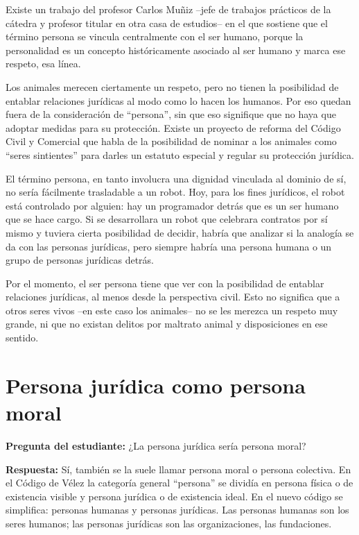 \documentclass[12pt,oneside]{book}
\begin{document}
Existe un trabajo del profesor Carlos Muñiz --jefe de trabajos prácticos de la cátedra y profesor titular en otra casa de estudios-- en el que sostiene que el término persona se vincula centralmente con el ser humano, porque la personalidad es un concepto históricamente asociado al ser humano y marca ese respeto, esa línea.

Los animales merecen ciertamente un respeto, pero no tienen la posibilidad de entablar relaciones jurídicas al modo como lo hacen los humanos. Por eso quedan fuera de la consideración de ``persona'', sin que eso signifique que no haya que adoptar medidas para su protección. Existe un proyecto de reforma del Código Civil y Comercial que habla de la posibilidad de nominar a los animales como ``seres sintientes'' para darles un estatuto especial y regular su protección jurídica.

El término persona, en tanto involucra una dignidad vinculada al dominio de sí, no sería fácilmente trasladable a un robot. Hoy, para los fines jurídicos, el robot está controlado por alguien: hay un programador detrás que es un ser humano que se hace cargo. Si se desarrollara un robot que celebrara contratos por sí mismo y tuviera cierta posibilidad de decidir, habría que analizar si la analogía se da con las personas jurídicas, pero siempre habría una persona humana o un grupo de personas jurídicas detrás.

\begin{note}
Por el momento, el ser persona tiene que ver con la posibilidad de entablar relaciones jurídicas, al menos desde la perspectiva civil. Esto no significa que a otros seres vivos --en este caso los animales-- no se les merezca un respeto muy grande, ni que no existan delitos por maltrato animal y disposiciones en ese sentido.
\end{note}

\section{Persona jurídica como persona moral}

\textbf{Pregunta del estudiante:} ¿La persona jurídica sería persona moral?

\textbf{Respuesta:} Sí, también se la suele llamar persona moral o persona colectiva. En el Código de Vélez la categoría general ``persona'' se dividía en persona física o de existencia visible y persona jurídica o de existencia ideal. En el nuevo código se simplifica: personas humanas y personas jurídicas. Las personas humanas son los seres humanos; las personas jurídicas son las organizaciones, las fundaciones.
\end{document}
